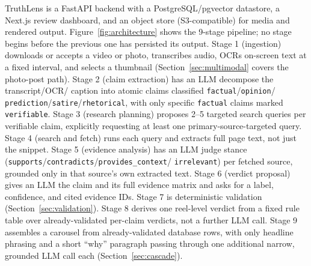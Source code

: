 \documentclass[conference]{IEEEtran}
\begin{document}
TruthLens is a FastAPI backend with a PostgreSQL/pgvector datastore, a
Next.js review dashboard, and an object store (S3-compatible) for media
and rendered output. Figure~\ref{fig:architecture} shows the 9-stage
pipeline; no stage begins before the previous one has persisted its
output. Stage 1 (ingestion) downloads or accepts a video or photo,
transcribes audio, OCRs on-screen text at a fixed interval, and selects a
thumbnail (Section~\ref{sec:multimodal} covers the photo-post path).
Stage 2 (claim extraction) has an LLM decompose the transcript/OCR/
caption into atomic claims classified \texttt{factual}/\texttt{opinion}/
\texttt{prediction}/\texttt{satire}/\texttt{rhetorical}, with only
specific \texttt{factual} claims marked \texttt{verifiable}. Stage 3
(research planning) proposes 2--5 targeted search queries per verifiable
claim, explicitly requesting at least one primary-source-targeted query.
Stage 4 (search and fetch) runs each query and extracts full page text,
not just the snippet. Stage 5 (evidence analysis) has an LLM judge
stance (\texttt{supports}/\texttt{contradicts}/\texttt{provides\_context}/
\texttt{irrelevant}) per fetched source, grounded only in that source's
own extracted text. Stage 6 (verdict proposal) gives an LLM the claim and
its full evidence matrix and asks for a label, confidence, and cited
evidence IDs. Stage 7 is deterministic validation
(Section~\ref{sec:validation}). Stage 8 derives one reel-level verdict
from a fixed rule table over already-validated per-claim verdicts, not a
further LLM call. Stage 9 assembles a carousel from already-validated
database rows, with only headline phrasing and a short ``why'' paragraph
passing through one additional narrow, grounded LLM call each
(Section~\ref{sec:cascade}).
\end{document}
